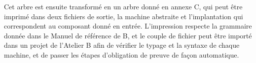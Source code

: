 Cet arbre est ensuite transformé en un arbre donné en annexe C,
qui peut être imprimé dans deux fichiers de sortie, 
la machine abstraite et l'implantation qui correspondent au composant
donné en entrée. L'impression respecte la grammaire donnée dans le
Manuel de référence de B\cite{BRef}, et le couple de fichier peut être importé
dans un projet de l'Atelier B afin de vérifier le typage et la syntaxe
de chaque machine, et de passer les étapes d'obligation de preuve de
façon automatique.

